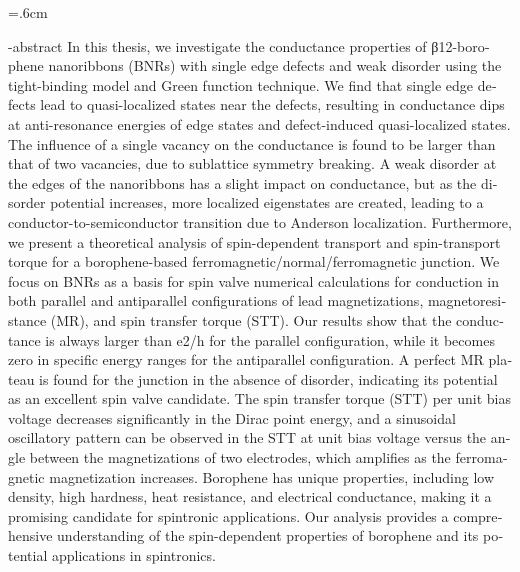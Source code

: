 
\baselineskip=.6cm
\begin{latin}
 

\en-abstract{
In this thesis, we investigate the conductance properties of β12-borophene nanoribbons (BNRs) with single edge defects and weak disorder using the tight-binding model and Green function technique. We find that single edge defects lead to quasi-localized states near the defects, resulting in conductance dips at anti-resonance energies of edge states and defect-induced quasi-localized states. The influence of a single vacancy on the conductance is found to be larger than that of two vacancies, due to sublattice symmetry breaking. A weak disorder at the edges of the nanoribbons has a slight impact on conductance, but as the disorder potential increases, more localized eigenstates are created, leading to a conductor-to-semiconductor transition due to Anderson localization. Furthermore, we present a theoretical analysis of spin-dependent transport and spin-transport torque for a borophene-based ferromagnetic/normal/ferromagnetic junction. We focus on BNRs as a basis for spin valve numerical calculations for conduction in both parallel and antiparallel configurations of lead magnetizations, magnetoresistance (MR), and spin transfer torque (STT). Our results show that the conductance is always larger than e2/h for the parallel configuration, while it becomes zero in specific energy ranges for the antiparallel configuration. A perfect MR plateau is found for the junction in the absence of disorder, indicating its potential as an excellent spin valve candidate. The spin transfer torque (STT) per unit bias voltage decreases significantly in the Dirac point energy, and a sinusoidal oscillatory pattern can be observed in the STT at unit bias voltage versus the angle between the magnetizations of two electrodes, which amplifies as the ferromagnetic magnetization increases. Borophene has unique properties, including low density, high hardness, heat resistance, and electrical conductance, making it a promising candidate for spintronic applications. Our analysis provides a comprehensive understanding of the spin-dependent properties of borophene and its potential applications in spintronics.
}
\latinfirstPage
\end{latin}
